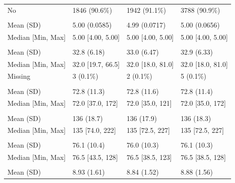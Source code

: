 \documentclass[
]{article}
\begin{document}
\begin{longtable}[t]{llll}
\hspace{1em}No & 1846 (90.6\%) & 1942 (91.1\%) & 3788 (90.9\%)\\
\addlinespace[0.3em]
\multicolumn{4}{l}{\textbf{INCPASSN}}\\
\hspace{1em}Mean (SD) & 5.00 (0.0585) & 4.99 (0.0717) & 5.00 (0.0656)\\
\hspace{1em}Median [Min, Max] & 5.00 [4.00, 5.00] & 5.00 [4.00, 5.00] & 5.00 [4.00, 5.00]\\
\addlinespace[0.3em]
\multicolumn{4}{l}{\textbf{BMIBL}}\\
\hspace{1em}Mean (SD) & 32.8 (6.18) & 33.0 (6.47) & 32.9 (6.33)\\
\hspace{1em}Median [Min, Max] & 32.0 [19.7, 66.5] & 32.0 [18.0, 81.0] & 32.0 [18.0, 81.0]\\
\hspace{1em}Missing & 3 (0.1\%) & 2 (0.1\%) & 5 (0.1\%)\\
\addlinespace[0.3em]
\multicolumn{4}{l}{\textbf{PULSEBL}}\\
\hspace{1em}Mean (SD) & 72.8 (11.3) & 72.8 (11.6) & 72.8 (11.4)\\
\hspace{1em}Median [Min, Max] & 72.0 [37.0, 172] & 72.0 [35.0, 121] & 72.0 [35.0, 172]\\
\addlinespace[0.3em]
\multicolumn{4}{l}{\textbf{SYSBPBL}}\\
\hspace{1em}Mean (SD) & 136 (18.7) & 136 (17.9) & 136 (18.3)\\
\hspace{1em}Median [Min, Max] & 135 [74.0, 222] & 135 [72.5, 227] & 135 [72.5, 227]\\
\addlinespace[0.3em]
\multicolumn{4}{l}{\textbf{DIABPBL}}\\
\hspace{1em}Mean (SD) & 76.1 (10.4) & 76.0 (10.3) & 76.1 (10.3)\\
\hspace{1em}Median [Min, Max] & 76.5 [43.5, 128] & 76.5 [38.5, 123] & 76.5 [38.5, 128]\\
\addlinespace[0.3em]
\multicolumn{4}{l}{\textbf{HBA1CBL}}\\
\hspace{1em}Mean (SD) & 8.93 (1.61) & 8.84 (1.52) & 8.88 (1.56)\\

\end{longtable}
\end{document}
